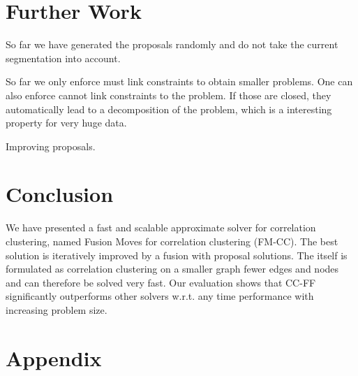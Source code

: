 \documentclass[10pt,twocolumn,letterpaper]{article}
\begin{document}
\section{Further Work}\label{sec:future}
So far we have generated the proposals randomly and do not take the current segmentation into account.

So far we only enforce must link constraints to obtain smaller problems.
One can also enforce cannot link constraints to the problem. 
If those are closed, they automatically lead to a decomposition of the problem, 
which is a interesting property for very huge data.

Improving proposals.




\section{Conclusion}\label{sec:conclusion}

We have presented a fast and scalable 
approximate solver for correlation 
clustering, named Fusion Moves for correlation clustering (FM-CC).
The best solution is iteratively improved 
by a fusion with proposal solutions.
The itself is formulated as correlation
clustering on a smaller graph fewer edges and nodes
and can therefore be solved very fast.
Our evaluation shows that CC-FF
significantly outperforms 
other solvers w.r.t. any time performance 
with increasing problem size.


    


\newpage

\FloatBarrier
{\small


}

\newpage

\onecolumn
\section{Appendix}








\end{document}
